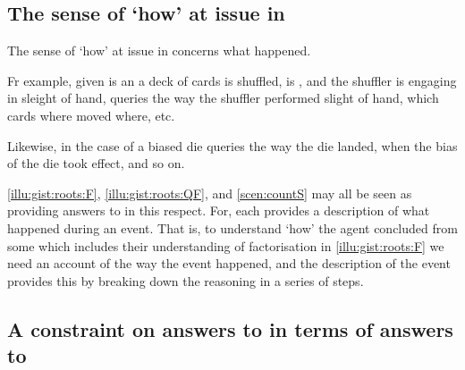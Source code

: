 \subsection{The sense of `how' at issue in \qHow{}}


\begin{note}
  The sense of `how' at issue in \qHow{} concerns what happened.

  Fr example, given is an  a deck of cards is shuffled, \mainCard{} is \mainCardPos{}, and the shuffler is engaging in sleight of hand, \qHow{} queries the way the shuffler performed slight of hand, which cards where moved where, etc.

  Likewise, in the case of a biased die \qHow{} queries the way the die landed, when the bias of the die took effect, and so on.

   \ref{illu:gist:roots:F}, \ref{illu:gist:roots:QF}, and \ref{scen:countS} may all be seen as providing answers to \qHow{} in this respect.
  For, each \scen{} provides a description of what happened during an event.
  That is, to understand `how' the agent concluded  from some \pool{} which includes their understanding of factorisation in \autoref{illu:gist:roots:F} we need an account of the way the event happened, and the description of the event provides this by breaking down the \agents{} reasoning in a series of steps.
\end{note}



\subsection{A constraint on answers to \qWhy{} in terms of answers to \qHow{}}



